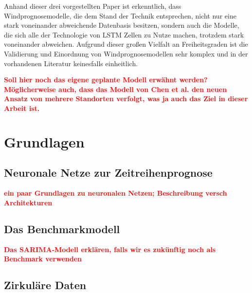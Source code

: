 \documentclass[
12pt, %
toc=listofnumbered, %
toc=chapterentrydotfill, %
numbers=noenddot, %
captions=tableheading, %
bibliography=numbered
]{scrreprt}
\let\Oldsection\section
\renewcommand{\section}{\FloatBarrier\Oldsection}
\newcommand{\highlight}[1]{\textbf{\textcolor{red}{#1}}}
\begin{document}
Anhand dieser drei vorgestellten Paper ist erkenntlich, dass Windprognosemodelle, die dem Stand der Technik entsprechen, nicht nur eine stark voneinander abweichende Datenbasis besitzen, sondern auch die Modelle, die sich alle der Technologie von LSTM Zellen 
zu Nutze machen, trotzdem stark voneinander abweichen. Aufgrund dieser großen Vielfalt an Freiheitsgraden ist die Validierung und Einordnung von Windprognosemodellen sehr komplex und in der vorhandenen Literatur keinesfalls einheitlich.

\highlight{
	Soll hier noch das eigene geplante Modell erwähnt werden? Möglicherweise auch, dass das Modell von Chen et al. den neuen Ansatz von mehrere Standorten verfolgt, was ja auch das Ziel in dieser Arbeit ist.
}



\chapter{Grundlagen}

\section{Neuronale Netze zur Zeitreihenprognose}
\highlight{ein paar Grundlagen zu neuronalen Netzen; 
Beschreibung versch Architekturen}

\section{Das Benchmarkmodell}
\highlight{Das SARIMA-Modell erklären, falls wir es zukünftig noch als Benchmark verwenden}

\section{Zirkuläre Daten}\label{section:circ_data}
\end{document}
